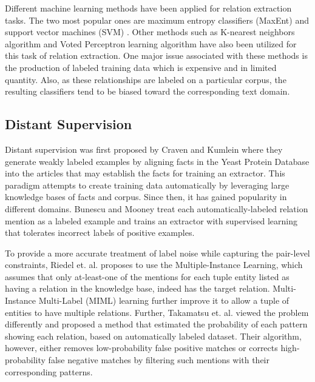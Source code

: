 Different machine learning methods have been applied for relation extraction tasks. The two most popular ones are maximum entropy classifiers (MaxEnt) \cite{yao2010multi} and support vector machines (SVM) \cite{hong2005relation}. Other methods such as K-nearest neighbors algorithm \cite{grishman2005nyu} and Voted Perceptron learning algorithm \cite{zelenko2003kernel} have also been utilized for this task of relation extraction. One major issue associated with these methods is the production of labeled training data which is expensive and in limited quantity. Also, as these relationships are labeled on a particular corpus, the resulting classifiers tend to be biased toward the corresponding text domain. 

\subsection{Distant Supervision}
\label{subsection:distant-supervision}
Distant supervision was first proposed by Craven and Kumlein \cite{craven1999constructing} where they generate weakly labeled examples by aligning facts in the Yeast Protein Database into the articles that may establish the facts for training an extractor. This paradigm attempts to create training data automatically by leveraging large knowledge bases of facts and corpus. Since then, it has gained popularity in different domains. Bunescu and Mooney \cite{bunescu2007learning} treat each automatically-labeled relation mention as a labeled example and trains an extractor with supervised learning that tolerates incorrect labels of positive examples. 

To provide a more accurate treatment of label noise while capturing the pair-level constraints, Riedel et. al. \cite{riedel2010modeling} proposes to use the Multiple-Instance Learning, which assumes that only at-least-one of the mentions for each tuple entity listed as having a relation in the knowledge base, indeed has the target relation. Multi-Instance Multi-Label (MIML) learning \cite{surdeanu2012multi} further improve it to allow a tuple of entities to have multiple relations. Further, Takamatsu et. al. \cite{takamatsu2012reducing} viewed the problem differently and proposed a method that estimated the probability of each pattern showing each relation, based on automatically labeled dataset. Their algorithm, however, either removes low-probability false positive matches or corrects high-probability false negative matches by filtering such mentions with their corresponding patterns. 

